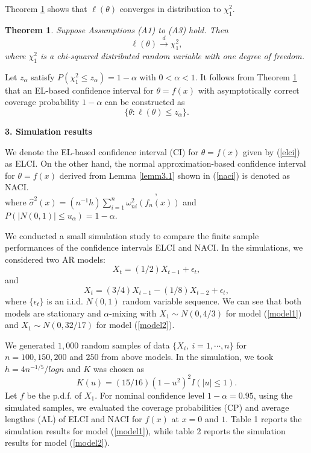 \documentclass[12pt]{article}
\newtheorem{theo}{\sc Theorem}
\newcommand{\tod}{\stackrel{d}{\longrightarrow}}
\def\be{\begin{equation}}
\def\ee{\end{equation}}
\begin{document}
\smallskip

Theorem \ref{theo3.1}
shows that $\ell(\theta)$ converges in distribution  to $\chi^2_1$.
\begin{theo}\label{theo3.1}
Suppose Assumptions (A1) to (A3) hold. Then
\[
\ell(\theta)\tod \chi^2_1, \label{lim00.01}
\]
where $\chi^2_1$ is a chi-squared distributed random variable with
one  degree of freedom.
\end{theo}


Let $z_{\alpha}$ satisfy  $P(\chi^2_1\leq z_{\alpha})=1-\alpha$ with $0<\alpha<1$.
It follows from Theorem \ref{theo3.1} that an EL-based confidence interval for $\theta=f(x)$ with asymptotically correct
coverage probability $1-\alpha$ can be constructed as
\be
\{ \theta: \ell(\theta)\leq z_{\alpha} \}. \label{elci}
\ee


\bigskip
\setcounter{section}{3}
\setcounter{equation}{0}
 \noindent
{\bf 3. Simulation results}
\bigskip


We denote the EL-based confidence interval (CI) for $\theta=f(x)$ given by (\ref{elci})  as ELCI. On the other hand,
the normal approximation-based confidence interval for $\theta=f(x)$ derived from Lemma \ref{lemm3.1} shown in (\ref{naci}) is denoted as NACI.
\be
[f_n(x)-\hat{\sigma}(x)u_{\alpha}/(nh)^{1/2},     f_n(x)+\hat{\sigma}(x)u_{\alpha}/(nh)^{1/2} ],  \label{naci}
\ee
where $\hat{\sigma}^2(x)=(n^{-1}h)\sum^{n}_{i=1}\omega^2_{ni}(f_n(x))$ and $P(|N(0, 1)|\leq u_{\alpha})=1-\alpha$.


We conducted a small simulation study  to compare the finite sample performances of the confidence intervals ELCI and NACI.
In the simulations, we considered two AR models:
\be
X_t=(1/2)X_{t-1}+\epsilon_t,     \label{model1}
\ee
and
\be
X_t=(3/4)X_{t-1}-(1/8)X_{t-2}+\epsilon_t,  \label{model2}
\ee
where $\{\epsilon_t\}$ is an i.i.d. $N(0, 1)$ random variable sequence. We can see that both models are stationary and $\alpha$-mixing with $X_1\sim N(0, 4/3)$
for model (\ref{model1}) and  $X_1\sim N(0, 32/17)$
for model (\ref{model2}).


We generated $1,000$ random samples of  data $\{X_{i}, \ i=1,
\cdots, n\}$ for $n=100, 150, 200$ and $250$ from above  models.
 In the simulation,  we took $h=4n^{-1/5}/log n$ and
$K$ was chosen as
\[
K(u)=(15/ 16)(1-u^2)^2I(|u|\leq 1).
\]
Let $f$ be the p.d.f. of $X_1$. For nominal confidence level $1-\alpha=0.95$, using the simulated samples, we evaluated the
coverage probabilities (CP) and average lengthes (AL)
of ELCI and NACI for $f(x)$ at $x=0$ and $1$. Table 1 reports the simulation results for model (\ref{model1}), while table 2 reports
the simulation results for model (\ref{model2}).
\end{document}
